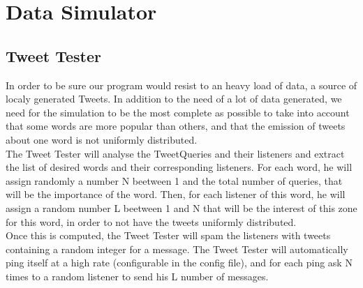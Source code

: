\section{Data Simulator}
\subsection{Tweet Tester}
In order to be sure our program would resist to an heavy load of data, a source of localy generated Tweets. In addition to the need of a lot of data generated, we need for the simulation to be the most complete as possible to take into account that some words are more popular than others, 
and that the emission of tweets about one word is not uniformly distributed. \\
The Tweet Tester will analyse the TweetQueries and their listeners and extract the list of desired words and their corresponding listeners. For each word, he will assign randomly a number N beetween 1 and the total number of queries, that will be the importance of the word. Then, for each listener of this word, he will assign a random number L beetween 1 and N that will be the interest of this zone for this word, in order to not have the tweets uniformly distributed.\\
Once this is computed, the Tweet Tester will spam the listeners with tweets containing a random integer for a message. The Tweet Tester will automatically ping itself at a high rate (configurable in the config file), and for each ping ask N times to a random listener to send his L number of messages.
